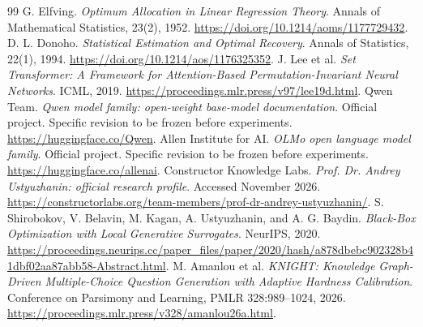 \documentclass[11pt,a4paper]{article}
\theoremstyle{definition}\newtheorem{definition}[theorem]{Definition}
\theoremstyle{remark}\newtheorem{remark}[theorem]{Remark}
\begin{document}
\begin{thebibliography}{99}
 G. Elfving. \emph{Optimum Allocation in Linear Regression Theory}. Annals of Mathematical Statistics, 23(2), 1952. \url{https://doi.org/10.1214/aoms/1177729432}.
 D. L. Donoho. \emph{Statistical Estimation and Optimal Recovery}. Annals of Statistics, 22(1), 1994. \url{https://doi.org/10.1214/aos/1176325352}.
 J. Lee et al. \emph{Set Transformer: A Framework for Attention-Based Permutation-Invariant Neural Networks}. ICML, 2019. \url{https://proceedings.mlr.press/v97/lee19d.html}.
 Qwen Team. \emph{Qwen model family: open-weight base-model documentation}. Official project. Specific revision to be frozen before experiments. \url{https://huggingface.co/Qwen}.
 Allen Institute for AI. \emph{OLMo open language model family}. Official project. Specific revision to be frozen before experiments. \url{https://huggingface.co/allenai}.
 Constructor Knowledge Labs. \emph{Prof. Dr. Andrey Ustyuzhanin: official research profile}. Accessed November 2026. \url{https://constructorlabs.org/team-members/prof-dr-andrey-ustyuzhanin/}.
 S. Shirobokov, V. Belavin, M. Kagan, A. Ustyuzhanin, and A. G. Baydin. \emph{Black-Box Optimization with Local Generative Surrogates}. NeurIPS, 2020. \url{https://proceedings.neurips.cc/paper_files/paper/2020/hash/a878dbebc902328b41dbf02aa87abb58-Abstract.html}.
 M. Amanlou et al. \emph{KNIGHT: Knowledge Graph-Driven Multiple-Choice Question Generation with Adaptive Hardness Calibration}. Conference on Parsimony and Learning, PMLR 328:989--1024, 2026. \url{https://proceedings.mlr.press/v328/amanlou26a.html}.
\end{thebibliography}
\end{document}
